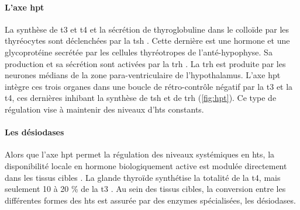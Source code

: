\documentclass[../main.tex]{subfiles}
\begin{document}
\paragraph{L'axe \gls{hpt}}\label{par:hpt}
La synthèse de \gls{t3} et \gls{t4} et la sécrétion de thyroglobuline dans le colloïde par les thyréocytes sont déclenchées par la \gls{tsh} \citep{Vagenakis1973}.
Cette dernière est une hormone et une glycoprotéine secrétée par les cellules thyréotropes de l'anté-hypophyse.
Sa production et sa sécrétion sont activées par la \gls{trh} \citep{Halasz1965}.
La \gls{trh} est produite par les neurones médians de la zone para-ventriculaire de l'hypothalamus.
L'axe  \gls{hpt} intègre ces trois organes dans une boucle de rétro-contrôle négatif par la \gls{t3} et la \gls{t4}, ces dernières inhibant la synthèse de \gls{tsh} \citep{Larsen1982} et de \gls{trh} \citep{Koller1987} (\autoref{fig:hpt}).
Ce type de régulation vise à maintenir des niveaux d'\glspl{ht} constants.



\paragraph{Les désiodases}
Alors que l'axe \gls{hpt} permet la régulation des niveaux systémiques en \glspl{ht}, la disponibilité locale en hormone biologiquement active est modulée directement dans les tissus cibles \citep{Bianco2006}.
La glande thyroïde synthétise la totalité de la \gls{t4}, mais seulement 10 à 20 \% de la \gls{t3} \citep{Laurberg1984}.
Au sein des tissus cibles, la conversion entre les différentes formes des \glspl{ht} est assurée par des enzymes spécialisées, les désiodases.


\end{document}
